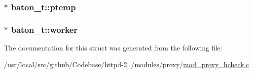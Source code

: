 \subsubsection[{\texorpdfstring{ptemp}{ptemp}}]{$\ast$ baton\+\_\+t\+::ptemp}\hypertarget{structbaton__t_aa272172683f3241239a7a4a1280dd1f4}{}\label{structbaton__t_aa272172683f3241239a7a4a1280dd1f4}
\subsubsection[{\texorpdfstring{worker}{worker}}]{$\ast$ baton\+\_\+t\+::worker}\hypertarget{structbaton__t_a391780335821f8e6c475cdba9d21e215}{}\label{structbaton__t_a391780335821f8e6c475cdba9d21e215}


The documentation for this struct was generated from the following file\+:\begin{DoxyCompactItemize}
\item 
/usr/local/src/github/\+Codebase/httpd-\/2../modules/proxy/\hyperlink{mod__proxy__hcheck_8c}{mod\+\_\+proxy\+\_\+hcheck.\+c}\end{DoxyCompactItemize}
